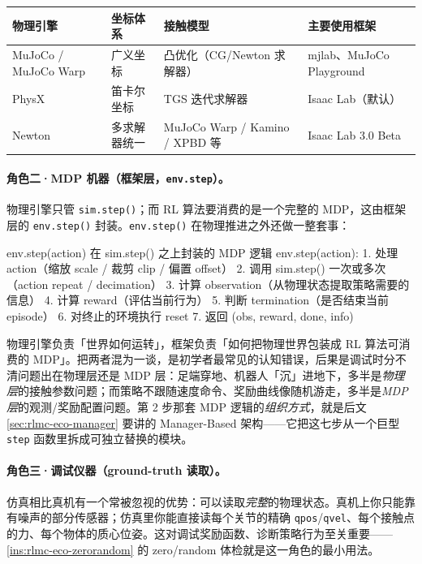\begin{center}
\small
\begin{tabular}{@{}llll@{}}
\toprule
物理引擎 & 坐标体系 & 接触模型 & 主要使用框架 \\
\midrule
MuJoCo / MuJoCo Warp & 广义坐标 & 凸优化（CG/Newton 求解器） & mjlab、MuJoCo Playground \\
PhysX & 笛卡尔坐标 & TGS 迭代求解器 & Isaac Lab（默认） \\
Newton & 多求解器统一 & MuJoCo Warp / Kamino / XPBD 等 & Isaac Lab 3.0 Beta \\
\bottomrule
\end{tabular}
\end{center}

\paragraph{角色二·MDP 机器（框架层，\texttt{env.step}）。}物理引擎只管 \verb|sim.step()|；而 RL 算法要消费的是一个完整的 MDP，这由框架层的 \verb|env.step()| 封装。\verb|env.step()| 在物理推进之外还做一整套事：

\begin{codebox}[text]{env.step(action) 在 sim.step() 之上封装的 MDP 逻辑}
env.step(action):
    1. 处理 action（缩放 scale / 裁剪 clip / 偏置 offset）
    2. 调用 sim.step() 一次或多次（action repeat / decimation）
    3. 计算 observation（从物理状态提取策略需要的信息）
    4. 计算 reward（评估当前行为）
    5. 判断 termination（是否结束当前 episode）
    6. 对终止的环境执行 reset
    7. 返回 (obs, reward, done, info)
\end{codebox}

\begin{insight}\label{ins:rlmc-eco-simenv}
物理引擎负责「世界如何运转」，框架负责「如何把物理世界包装成 RL 算法可消费的 MDP」。把两者混为一谈，是初学者最常见的认知错误，后果是调试时分不清问题出在物理层还是 MDP 层：足端穿地、机器人「沉」进地下，多半是\emph{物理层}的接触参数问题；而策略不跟随速度命令、奖励曲线像随机游走，多半是\emph{MDP 层}的观测/奖励配置问题。第 2 步那套 MDP 逻辑的\emph{组织方式}，就是后文 \cref{sec:rlmc-eco-manager} 要讲的 Manager-Based 架构——它把这七步从一个巨型 \verb|step| 函数里拆成可独立替换的模块。
\end{insight}

\paragraph{角色三·调试仪器（ground-truth 读取）。}仿真相比真机有一个常被忽视的优势：可以读取\emph{完整}的物理状态。真机上你只能靠有噪声的部分传感器；仿真里你能直接读每个关节的精确 \verb|qpos|/\allowbreak\verb|qvel|、每个接触点的力、每个物体的质心位姿。这对调试奖励函数、诊断策略行为至关重要——\cref{ins:rlmc-eco-zerorandom} 的 zero/random 体检就是这一角色的最小用法。

